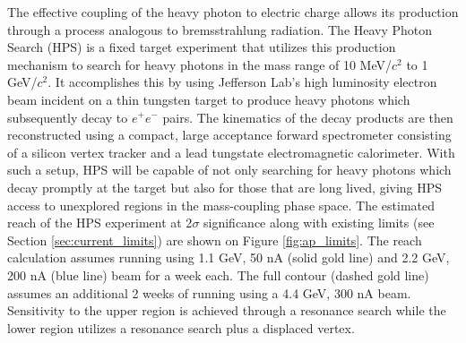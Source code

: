The effective coupling of the heavy photon to electric charge allows its 
production through a process analogous to bremsstrahlung radiation.  The Heavy
Photon Search (HPS)  is a fixed target experiment that utilizes this production
mechanism to search
for heavy photons in the mass range of 10 MeV/$c^2$ to 1 GeV/$c^2$. It accomplishes
this by using 
Jefferson Lab's high luminosity electron beam incident on a thin
tungsten target to produce heavy photons which subsequently decay to $e^+e^-$
pairs. The kinematics of the decay products are then reconstructed using 
a compact, large acceptance forward spectrometer consisting of a silicon vertex
tracker and a lead tungstate electromagnetic calorimeter. With such a setup,
HPS will be capable of not only searching for heavy photons which decay promptly
at the target but also for those that are long lived, giving 
HPS access to unexplored regions in the mass-coupling phase space. 
The estimated reach of the HPS experiment at 
2$\sigma$ significance along with existing limits 
(see Section \ref{sec:current_limits}) are shown on Figure 
\ref{fig:ap_limits}. The reach calculation assumes running using 1.1
GeV, 50 nA (solid gold line) and 2.2 GeV, 200 nA (blue line) beam for a week
each.  The full 
contour (dashed gold line) assumes an additional 2 weeks of running using 
a 4.4 GeV, 300 nA beam. 
Sensitivity to the upper region is achieved through a resonance search while
the lower region utilizes a resonance search plus a displaced vertex.

